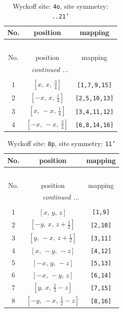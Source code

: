 \documentclass[fleqn,8pt]{jsarticle}
\begin{document}
\renewcommand{\arraystretch}{1.2}
\begin{longtable}{ccc}
\caption{Wyckoff site: {\tt 4o}, site symmetry: {\tt ..21'}}
 \\
 \hline \hline
No. & position & mapping \\ \hline \endfirsthead

\multicolumn{2}{l}{\tablename\ \thetable{}} \\
 \hline \hline
No. & position & mapping \\ \hline \endhead

 \hline \hline
\multicolumn{2}{r}{\footnotesize\it continued ...} \\ \endfoot

 \hline \hline
\multicolumn{2}{r}{} \\ \endlastfoot

1 & $\left[ x,\, x,\, \frac{3}{4} \right]$ & {\tt [1,7,9,15]} \\ \hline
2 & $\left[ - x,\, x,\, \frac{1}{4} \right]$ & {\tt [2,5,10,13]} \\ \hline
3 & $\left[ x,\, - x,\, \frac{1}{4} \right]$ & {\tt [3,4,11,12]} \\ \hline
4 & $\left[ - x,\, - x,\, \frac{3}{4} \right]$ & {\tt [6,8,14,16]} \\
\end{longtable}
\renewcommand{\arraystretch}{1.2}
\begin{longtable}{ccc}
\caption{Wyckoff site: {\tt 8p}, site symmetry: {\tt 11'}}
 \\
 \hline \hline
No. & position & mapping \\ \hline \endfirsthead

\multicolumn{2}{l}{\tablename\ \thetable{}} \\
 \hline \hline
No. & position & mapping \\ \hline \endhead

 \hline \hline
\multicolumn{2}{r}{\footnotesize\it continued ...} \\ \endfoot

 \hline \hline
\multicolumn{2}{r}{} \\ \endlastfoot

1 & $\left[ x,\, y,\, z \right]$ & {\tt [1,9]} \\ \hline
2 & $\left[ - y,\, x,\, z + \frac{1}{2} \right]$ & {\tt [2,10]} \\ \hline
3 & $\left[ y,\, - x,\, z + \frac{1}{2} \right]$ & {\tt [3,11]} \\ \hline
4 & $\left[ x,\, - y,\, - z \right]$ & {\tt [4,12]} \\ \hline
5 & $\left[ - x,\, y,\, - z \right]$ & {\tt [5,13]} \\ \hline
6 & $\left[ - x,\, - y,\, z \right]$ & {\tt [6,14]} \\ \hline
7 & $\left[ y,\, x,\, \frac{1}{2} - z \right]$ & {\tt [7,15]} \\ \hline
8 & $\left[ - y,\, - x,\, \frac{1}{2} - z \right]$ & {\tt [8,16]} \\
\end{longtable}
\end{document}
